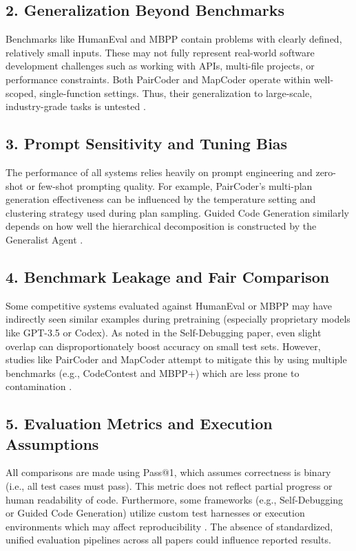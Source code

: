\documentclass[11pt,a4paper]{article}
\begin{document}
\subsection*{2. Generalization Beyond Benchmarks}
Benchmarks like HumanEval and MBPP contain problems with clearly defined, relatively small inputs. These may not fully represent real-world software development challenges such as working with APIs, multi-file projects, or performance constraints. Both PairCoder and MapCoder operate within well-scoped, single-function settings. Thus, their generalization to large-scale, industry-grade tasks is untested \cite{almorsi2025guided}.

\subsection*{3. Prompt Sensitivity and Tuning Bias}
The performance of all systems relies heavily on prompt engineering and zero-shot or few-shot prompting quality. For example, PairCoder’s multi-plan generation effectiveness can be influenced by the temperature setting and clustering strategy used during plan sampling. Guided Code Generation similarly depends on how well the hierarchical decomposition is constructed by the Generalist Agent \cite{zhang2024paircoder, almorsi2025guided}.

\subsection*{4. Benchmark Leakage and Fair Comparison}
Some competitive systems evaluated against HumanEval or MBPP may have indirectly seen similar examples during pretraining (especially proprietary models like GPT-3.5 or Codex). As noted in the Self-Debugging paper, even slight overlap can disproportionately boost accuracy on small test sets. However, studies like PairCoder and MapCoder attempt to mitigate this by using multiple benchmarks (e.g., CodeContest and MBPP+) which are less prone to contamination \cite{zhang2024paircoder, islam2024mapcodermultiagentcodegeneration}.

\subsection*{5. Evaluation Metrics and Execution Assumptions}
All comparisons are made using Pass@1, which assumes correctness is binary (i.e., all test cases must pass). This metric does not reflect partial progress or human readability of code. Furthermore, some frameworks (e.g., Self-Debugging or Guided Code Generation) utilize custom test harnesses or execution environments which may affect reproducibility \cite{almorsi2025guided}. The absence of standardized, unified evaluation pipelines across all papers could influence reported results.
\end{document}
